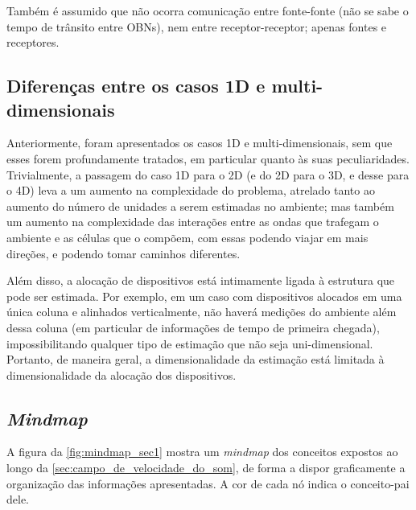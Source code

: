 Também é assumido que não ocorra comunicação entre fonte-fonte (não se sabe o tempo de trânsito entre OBNs), nem entre receptor-receptor; apenas fontes e receptores.

\subsection{Diferenças entre os casos 1D e multi-dimensionais} %

Anteriormente, foram apresentados os casos 1D e multi-dimensionais, sem que esses forem profundamente tratados, em particular quanto às suas peculiaridades. Trivialmente, a passagem do caso 1D para o 2D (e do 2D para o 3D, e desse para o 4D) leva a um aumento na complexidade do problema, atrelado tanto ao aumento do número de unidades a serem estimadas no ambiente; mas também um aumento na complexidade das interações entre as ondas que trafegam o ambiente e as células que o compõem, com essas podendo viajar em mais direções, e podendo tomar caminhos diferentes.

Além disso, a alocação de dispositivos está intimamente ligada à estrutura que pode ser estimada. Por exemplo, em um caso com dispositivos alocados em uma única coluna e alinhados verticalmente, não haverá medições do ambiente além dessa coluna (em particular de informações de tempo de primeira chegada), impossibilitando qualquer tipo de estimação que não seja uni-dimensional. Portanto, de maneira geral, a dimensionalidade da estimação está limitada à dimensionalidade da alocação dos dispositivos.

\subsection{\textsl{Mindmap}}

A figura da \cref{fig:mindmap_sec1} mostra um \textsl{mindmap} dos conceitos expostos ao longo da \cref{sec:campo_de_velocidade_do_som}, de forma a dispor graficamente a organização das informações apresentadas. A cor de cada nó indica o conceito-pai dele.


